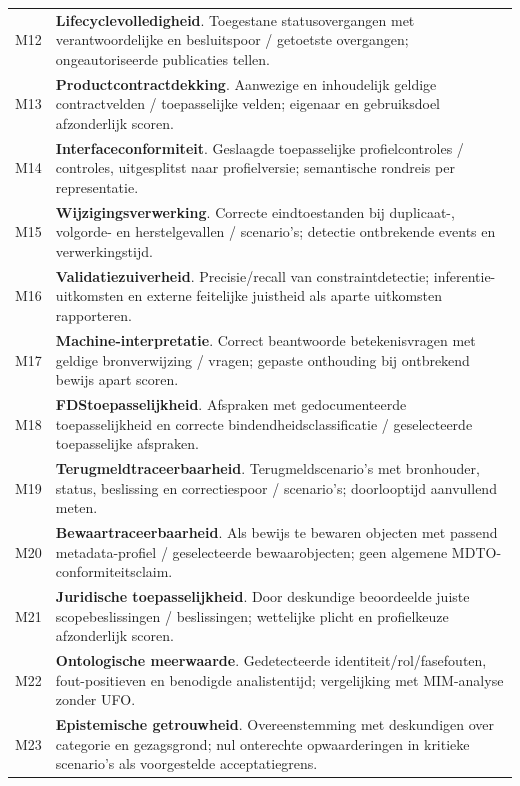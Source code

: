\begin{longtable}{@{}P{.07\linewidth}P{.84\linewidth}@{}}
M12 & \textbf{Lifecyclevolledigheid}. Toegestane statusovergangen met verantwoordelijke en besluitspoor / getoetste overgangen; ongeautoriseerde publicaties tellen. \\
M13 & \textbf{Productcontractdekking}. Aanwezige en inhoudelijk geldige contractvelden / toepasselijke velden; eigenaar en gebruiksdoel afzonderlijk scoren. \\
M14 & \textbf{Interfaceconformiteit}. Geslaagde toepasselijke profielcontroles / controles, uitgesplitst naar profielversie; semantische rondreis per representatie. \\
M15 & \textbf{Wijzigingsverwerking}. Correcte eindtoestanden bij duplicaat-, volgorde- en herstelgevallen / scenario’s; detectie ontbrekende events en verwerkingstijd. \\
M16 & \textbf{Validatiezuiverheid}. Precisie/recall van constraintdetectie; inferentie-uitkomsten en externe feitelijke juistheid als aparte uitkomsten rapporteren. \\
M17 & \textbf{Machine-interpretatie}. Correct beantwoorde betekenisvragen met geldige bronverwijzing / vragen; gepaste onthouding bij ontbrekend bewijs apart scoren. \\
M18 & \textbf{FDStoepasselijkheid}. Afspraken met gedocumenteerde toepasselijkheid en correcte bindendheidsclassificatie / geselecteerde toepasselijke afspraken. \\
M19 & \textbf{Terugmeldtraceerbaarheid}. Terugmeldscenario’s met bronhouder, status, beslissing en correctiespoor / scenario’s; doorlooptijd aanvullend meten. \\
M20 & \textbf{Bewaartraceerbaarheid}. Als bewijs te bewaren objecten met passend metadata-profiel / geselecteerde bewaarobjecten; geen algemene MDTO-conformiteitsclaim. \\
M21 & \textbf{Juridische toepasselijkheid}. Door deskundige beoordeelde juiste scopebeslissingen / beslissingen; wettelijke plicht en profielkeuze afzonderlijk scoren. \\
M22 & \textbf{Ontologische meerwaarde}. Gedetecteerde identiteit/rol/fasefouten, fout-positieven en benodigde analistentijd; vergelijking met MIM-analyse zonder UFO. \\
M23 & \textbf{Epistemische getrouwheid}. Overeenstemming met deskundigen over categorie en gezagsgrond; nul onterechte opwaarderingen in kritieke scenario’s als voorgestelde acceptatiegrens. \\
\bottomrule\end{longtable}